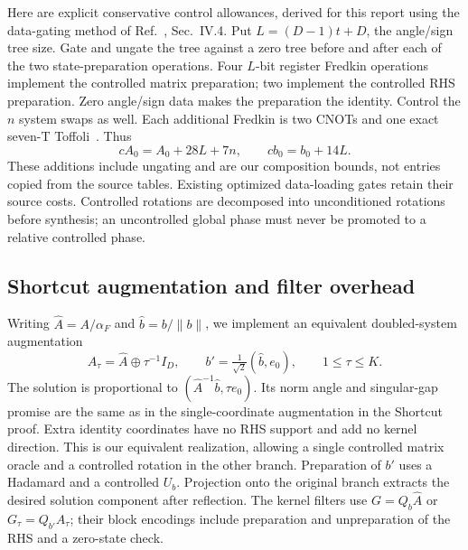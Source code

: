 \documentclass[11pt]{article}
\newcommand{\norm}[1]{\lVert #1\rVert}
\begin{document}
Here are explicit conservative control allowances, derived for this report using the data-gating method of Ref.~\cite{clader}, Sec.~IV.4. Put $L=(D-1)t+D$, the angle/sign tree size. Gate and ungate the tree against a zero tree before and after each of the two state-preparation operations. Four $L$-bit register Fredkin operations implement the controlled matrix preparation; two implement the controlled RHS preparation. Zero angle/sign data makes the preparation the identity. Control the $n$ system swaps as well. Each additional Fredkin is two CNOTs and one exact seven-T Toffoli~\cite{toffoli}. Thus
\begin{equation}\label{eq:control}
 cA_0=A_0+28L+7n,\qquad cb_0=b_0+14L.
\end{equation}
These additions include ungating and are our composition bounds, not entries copied from the source tables. Existing optimized data-loading gates retain their source costs. Controlled rotations are decomposed into unconditioned rotations before synthesis; an uncontrolled global phase must never be promoted to a relative controlled phase.

\subsection{Shortcut augmentation and filter overhead}
Writing $\widehat A=A/\alpha_F$ and $\widehat b=b/\norm b$, we implement an equivalent doubled-system augmentation
\begin{equation}
 A_\tau=\widehat A\oplus\tau^{-1}I_D,\qquad
 b'=\tfrac1{\sqrt2}(\widehat b,e_0),\qquad 1\le\tau\le K.
\end{equation}
The solution is proportional to $(\widehat A^{-1}\widehat b,\tau e_0)$. Its norm angle and singular-gap promise are the same as in the single-coordinate augmentation in the Shortcut proof. Extra identity coordinates have no RHS support and add no kernel direction. This is our equivalent realization, allowing a single controlled matrix oracle and a controlled rotation in the other branch. Preparation of $b'$ uses a Hadamard and a controlled $U_b$. Projection onto the original branch extracts the desired solution component after reflection. The kernel filters use $G=Q_b\widehat A$ or $G_\tau=Q_{b'}A_\tau$; their block encodings include preparation and unpreparation of the RHS and a zero-state check.
\end{document}

